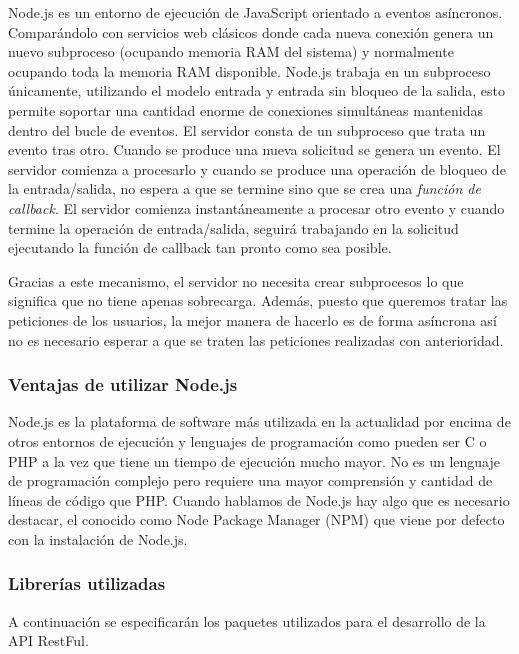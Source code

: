 Node.js es un entorno de ejecución de JavaScript \cite{javascript} orientado a eventos asíncronos. Comparándolo con servicios web clásicos donde cada nueva conexión genera un nuevo subproceso (ocupando memoria RAM del sistema) y normalmente ocupando toda la memoria RAM disponible. Node.js trabaja en un subproceso únicamente, utilizando el modelo entrada y entrada sin bloqueo de la salida, esto permite soportar una cantidad enorme de conexiones simultáneas mantenidas dentro del bucle de eventos. El servidor consta de un subproceso que trata un evento tras otro.
Cuando se produce una nueva solicitud se genera un evento. El servidor comienza a procesarlo y cuando se produce una operación de bloqueo de la entrada/salida, no espera a que se termine sino que se crea una \textit{función de callback}. El servidor comienza instantáneamente a procesar otro evento y cuando termine la operación de entrada/salida, seguirá trabajando en la solicitud ejecutando la función de callback tan pronto como sea posible.

Gracias a este mecanismo, el servidor no necesita crear subprocesos lo que significa que no tiene apenas sobrecarga. Además, puesto que queremos tratar las peticiones de los usuarios, la mejor manera de hacerlo es de forma asíncrona así no es necesario esperar a que se traten las peticiones realizadas con anterioridad.


\subsubsection{Ventajas de utilizar Node.js}

Node.js es la plataforma de software más utilizada en la actualidad por encima de otros entornos de ejecución y lenguajes de programación como pueden ser C o PHP a la vez que tiene un tiempo de ejecución mucho mayor. No es un lenguaje de programación complejo pero requiere una mayor comprensión y cantidad de líneas de código que PHP. Cuando hablamos de Node.js hay algo que es necesario destacar, el conocido como Node Package Manager (NPM) que viene por defecto con la instalación de Node.js.


\subsubsection{Librerías utilizadas}A continuación se especificarán los paquetes utilizados para el desarrollo de la API RestFul.

